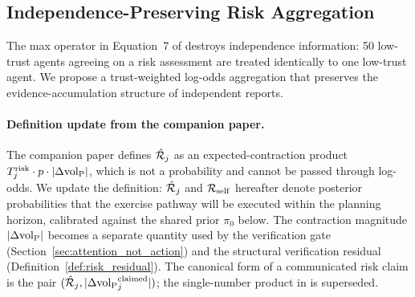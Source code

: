 \subsection{Independence-Preserving Risk Aggregation}

The max operator in Equation~7 of \citet{lasser2026horizon} destroys
independence information: 50 low-trust agents agreeing on a risk assessment
are treated identically to one low-trust agent. We propose a
trust-weighted log-odds aggregation that preserves the evidence-accumulation
structure of independent reports.

\paragraph{Definition update from the companion paper.}
The companion paper \citep{lasser2026horizon} defines
$\hat{\mathcal{R}}_j$ as an expected-contraction product
$T_j^{\mathrm{risk}} \cdot p \cdot |\Delta {\operatorname{vol}_{\mathrm{P}}}|$, which is not a
probability and cannot be passed through log-odds. We update the
definition: $\hat{\mathcal{R}}_j$ and $\mathcal{R}_{\mathrm{self}}$ hereafter
denote posterior probabilities that the exercise pathway will be
executed within the planning horizon, calibrated against the shared
prior $\pi_0$ below. The contraction magnitude $|\Delta {\operatorname{vol}_{\mathrm{P}}}|$
becomes a separate quantity used by the verification gate
(Section~\ref{sec:attention_not_action}) and the structural
verification residual (Definition~\ref{def:risk_residual}). The
canonical form of a communicated risk claim is the pair
$(\hat{\mathcal{R}}_j, |\Delta {\operatorname{vol}_{\mathrm{P}}}_j^{\mathrm{claimed}}|)$; the
single-number product in \citet{lasser2026horizon} is superseded.

